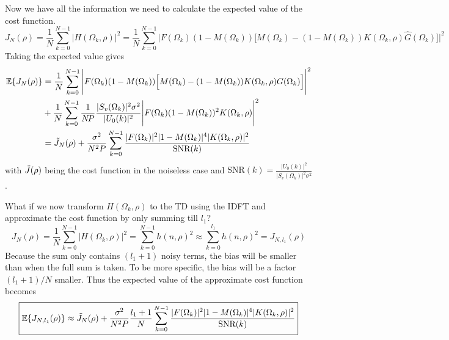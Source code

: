 Now we have all the information we need to calculate the expected value of the cost function.
\begin{equation*}
    J_N(\rho) = \frac{1}{N}\sum_{k=0}^{N-1} |H(\Omega_k,\rho)|^2 = \frac{1}{N} \sum_{k=0}^{N-1} \Bigg|F(\Omega_k)(1-M(\Omega_k)) \Big[M(\Omega_k)-(1-M(\Omega_k))K(\Omega_k,\rho) \hat{G}(\Omega_k)\Big]\Bigg|^2
\end{equation*}
Taking the expected value gives
\begin{align*}
    \mathbb{E}\{J_N(\rho)\} &= \frac{1}{N}\sum_{k=0}^{N-1} \Bigg|F(\Omega_k)(1-M(\Omega_k)) \Big[M(\Omega_k)-(1-M(\Omega_k))K(\Omega_k,\rho) G(\Omega_k)\Big]\Bigg|^2 \\
    &+ \frac{1}{N} \sum_{k=0}^{N-1} \frac{1}{N\!P} \frac{|S_v(\Omega_k)|^2 \sigma^2}{|U_0(k)|^2} \Bigg|F(\Omega_k)(1-M(\Omega_k))^2 K(\Omega_k,\rho) \Bigg|^2  \\
    &= \Tilde{J}_N(\rho) + \frac{\sigma^2}{N^2 P} \sum_{k=0}^{N-1} \frac{|F(\Omega_k)|^2|1-M(\Omega_k)|^4 |K(\Omega_k,\rho)|^2}{\text{SNR}(k)}
\end{align*}
with $\Tilde{J}(\rho)$ being the cost function in the noiseless case and $\text{SNR}(k) = \frac{|U_0(k)|^2}{|S_v(\Omega_k)|^2 \sigma^2}$.

What if we now transform $H(\Omega_k,\rho)$ to the TD using the IDFT and approximate the cost function by only summing till $l_1$?
\begin{equation*}
    J_N(\rho) = \frac{1}{N} \sum_{k=0}^{N-1} |H(\Omega_k,\rho)|^2 = \sum_{k=0}^{N-1} h(n,\rho)^2 \approx \sum_{k=0}^{l_1} h(n,\rho)^2 = J_{N,l_1}(\rho)
\end{equation*}
Because the sum only contains $(l_1+1)$ noisy terms, the bias will be smaller than when the full sum is taken. To be more specific, the bias will be a factor $(l_1+1)/N$ smaller. Thus the expected value of the approximate cost function becomes
\begin{equation}
\boxed{
    \mathbb{E}\{J_{N,l_1}(\rho)\} \approx \Tilde{J}_N(\rho) +  \frac{\sigma^2}{N^2 P} \frac{l_1+1}{N} \sum_{k=0}^{N-1} \frac{|F(\Omega_k)|^2|1-M(\Omega_k)|^4 |K(\Omega_k,\rho)|^2}{\text{SNR}(k)}
    }
    \label{eq:EJl1_FD}
\end{equation}

